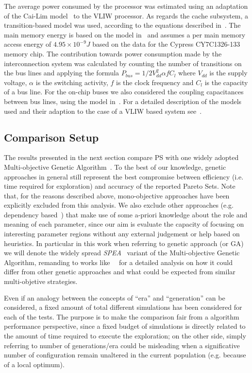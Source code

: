 The average power consumed by the processor was estimated using an
adaptation of the Cai-Lim model~\cite{cai_micro99} to the VLIW
processor. As regards the cache subsystem, a transition-based model
was used, according to the equations described
in~\cite{kamble_islped97}.  The main memory energy is based on the
model in~\cite{shiue_dac99} and assumes a per main memory access
energy of $4.95 \times 10^{-9} J$ based on the data for the Cypress
CY7C1326-133 memory chip.  The contribution towards power consumption
made by the interconnection system was calculated by counting the
number of transitions on the bus lines and applying the formula
$P_{bus} = 1/2 V_{dd}^2 \alpha f C_l$ where $V_{dd}$ is the supply
voltage, $\alpha$ is the switching activity, $f$ is the clock
frequency and $C_l$ is the capacity of a bus line. For the on-chip
buses we also considered the coupling capacitances between bus lines,
using the model in~\cite{lekatsas_dac01}. For a detailed description
of the models used and their adaption to the case of a VLIW based
system see~\cite{palpatti_estimedia03}.


\subsection{Comparison Setup}

The results presented in the next section compare PS with one widely
adopted Multi-objective Genetic Algorithm~\cite{knowles_techrep06}. To
the best of our knowledge, genetic approaches in general still
represent the best compromise between efficiency (i.e. time required
for exploration) and accuracy of the reported Pareto Sets.  Note that,
for the reasons described above, mono-objective approaches have been
explicitly excluded from this analysis.  We also exclude other
approaches (e.g.  dependency based~\cite{givargis_tvlsi02}) that make
use of some a-priori knowledge about the role and meaning of each
parameter, since our aim is evaluate the capacity of focusing on
interesting parameter regions without any external judgement or help
based on heuristics.  In particular in this work when referring to
genetic approach (or GA) we will denote the widely spread 
\emph{SPEA}~\cite{zitzler_eurogen01} variant of the Multi-objective
Genetic Algorithm, remanding to
works like~\cite{zitzler_ec00}~\cite{zitzler_tec03} for a detailed
analysis on how it could differ from other genetic approaches and what
could be expected from similar multi-objetive strategies. 

Even if an analogy between the concepts of ``era'' and ``generation'' 
can be considered, a fixed amount of total different simulations has been
considered for each of the tests. The purpose is to make the
comparison fair from a algorithm performance perspective, since a
fixed budget of simulations is directly related to the amount of time
required to execute the exploration; on the other side, simply
referring to number of generations/era could be misleading when a
significative number of configuration remain unaltered in the current
population (e.g. because of a local optimum).

